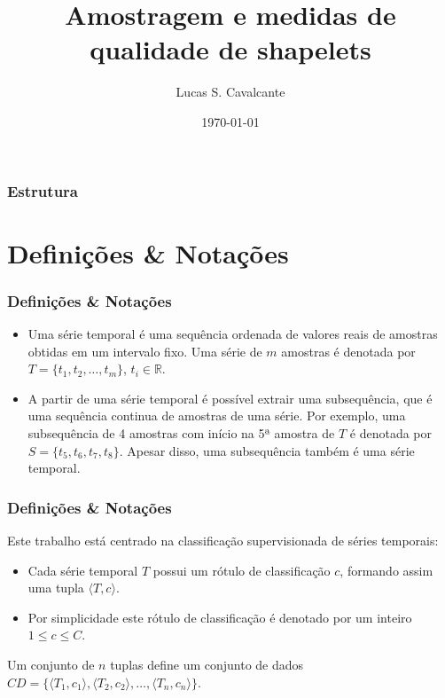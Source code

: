 \documentclass{beamer}
\title{Amostragem e medidas de qualidade de shapelets} %
\author{Lucas S. Cavalcante} %
\institute[ICMC-USP] %
{
Instituto de Ci{\^e}ncias Matem{\'a}ticas e de Computa{\c c}{\~a}o, Universidade de S{\~a}o Paulo \\ %
\medskip
\textit{Orientador: Gustavo E. A. P. A. Batista} %
}
\date{\today} %
\begin{document}
\begin{frame}
\titlepage %
\end{frame}

\begin{frame}
\frametitle{Estrutura}
\tableofcontents
\end{frame}


\section{Defini{\c c}{\~o}es \& Nota{\c c}{\~o}es}

\begin{frame}
\frametitle{Defini{\c c}{\~o}es \& Nota{\c c}{\~o}es}
\begin{itemize}
\item Uma s{\'e}rie temporal {\'e} uma sequ{\^e}ncia ordenada de valores reais de amostras obtidas em um intervalo fixo. Uma s{\'e}rie de $m$ amostras {\'e} denotada por $T = \{t_{1}, t_{2}, \dots, t_{m} \}$, $t_{i} \in \mathbb{R}$.

\item A partir de uma s{\'e}rie temporal {\'e} possível extrair uma subsequ{\^e}ncia, que {\'e} uma sequ{\^e}ncia continua de amostras de uma s{\'e}rie. Por exemplo, uma subsequ{\^e}ncia de 4 amostras com in{\'i}cio na 5ª amostra de $T$ {\'e} denotada por $S = \{t_{5}, t_{6}, t_{7}, t_{8} \}$. Apesar disso, uma subsequ{\^e}ncia tamb{\'e}m {\'e} uma série temporal.
\end{itemize}
\end{frame}


\begin{frame}
\frametitle{Defini{\c c}{\~o}es \& Nota{\c c}{\~o}es}
Este trabalho est{\'a} centrado na classifica{\c c}{\~a}o supervisionada de s{\'e}ries temporais:
\begin{itemize}
\item Cada s{\'e}rie temporal $T$ possui um r{\'o}tulo de classifica{\c c}{\~a}o $c$, formando assim uma tupla $\langle T, c \rangle$.
\item Por simplicidade este r{\'o}tulo de classifica{\c c}{\~a}o {\'e} denotado por um inteiro $1 \leq c \leq C$.
\end{itemize}

Um conjunto de $n$ tuplas define um conjunto de dados $CD =\{ \langle T_{1}, c_{1} \rangle, \langle T_{2}, c_{2} \rangle, \dots, \langle T_{n}, c_{n} \rangle \}$.
\end{frame}
\end{document}
